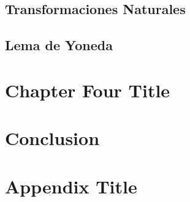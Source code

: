 \documentclass[12pt]{report}
\begin{document}
\section{Transformaciones Naturales}

\section{Lema de Yoneda}


\chapter{Chapter Four Title}


\chapter{Conclusion}

\printbibliography

\appendix
\chapter{Appendix Title}
\end{document}
